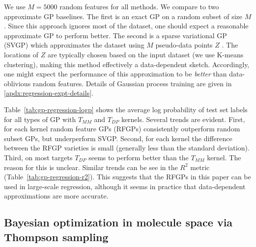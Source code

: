 We use $M=5000$ random features for all methods.
We compare to two approximate GP baselines.
The first is an exact GP on a random subset of size $M$.
Since this approach ignores most of the dataset,
one should expect a reasonable approximate GP to perform better.
The second is a sparse variational GP (SVGP) which approximates the dataset using $M$ pseudo-data points $Z$
\citep{titsias2009variational,hensman2013gaussian}.
The locations of $Z$ are typically chosen based on the input dataset (we use K-means clustering),
making this method effectively a data-dependent sketch.
Accordingly, one might expect the performance of this approximation to be \emph{better}
than data-oblivious random features.
Details of Gaussian process training are given in \cref{apdx:regression-expt-details}.

\begin{table}[tb]
\caption{
Average log probability of test set labels with various approximate GPs
for 5 targets from \textsc{dockstring} dataset \citep{garcia2022dockstring}.
$\pm$ values are standard deviations over 5 trials.
}
\label{tab:gp-regression-logp}
\begin{center}
\resizebox{0.95\textwidth}{!}{
\begin{sc}

\end{sc}
}
\end{center}
\end{table}

Table~\ref{tab:gp-regression-logp} shows the average log probability of test set labels
for all types of GP with $T_{MM}$ and $T_{DP}$ kernels.
Several trends are evident.
First, for each kernel random feature GPs (RFGPs) consistently outperform random subset GPs,
but underperform SVGP.
Second, for each kernel the difference between the RFGP varieties is small
(generally less than the standard deviation).
Third, on most targets $T_{DP}$ seems to perform better than the $T_{MM}$ kernel.
The reason for this is unclear.
Similar trends can be see in the $R^2$ metric (Table~\ref{tab:gp-regression-r2}).
This suggests that the RFGPs in this paper can be used in large-scale regression,
although it seems in practice that data-dependent approximations are more accurate.





\subsection{Bayesian optimization in molecule space via Thompson sampling}\label{sec:expt-bayesopt}

